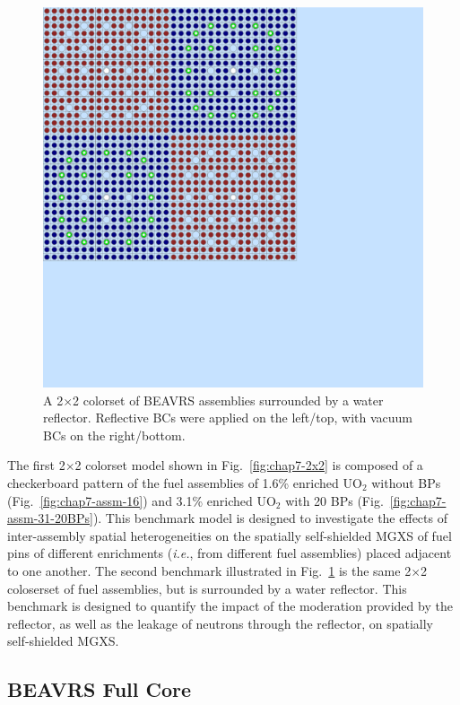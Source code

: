\begin{figure}[h!]
  \centering
  \includegraphics[width=0.63\linewidth]{figures/benchmarks/reflector}
\vspace{2mm}
\caption[A reflected 2$\times$2 colorset of BEAVRS assemblies]{A 2$\times$2 colorset of BEAVRS assemblies surrounded by a water reflector. Reflective \acp{BC} were applied on the left/top, with vacuum \acp{BC} on the right/bottom.}
\label{fig:chap7-reflector}
\end{figure}

The first 2$\times$2 colorset model shown in Fig.~\ref{fig:chap7-2x2} is composed of a checkerboard pattern of the fuel assemblies of 1.6\% enriched UO$_2$ without \acp{BP} (Fig.~\ref{fig:chap7-assm-16}) and 3.1\% enriched UO$_2$ with 20 \acp{BP} (Fig.~\ref{fig:chap7-assm-31-20BPs}). This benchmark model is designed to investigate the effects of inter-assembly spatial heterogeneities on the spatially self-shielded \ac{MGXS} of fuel pins of different enrichments (\textit{i.e.}, from different fuel assemblies) placed adjacent to one another. The second benchmark illustrated in Fig.~\ref{fig:chap7-reflector} is the same 2$\times$2 coloserset of fuel assemblies, but is surrounded by a water reflector. This benchmark is designed to quantify the impact of the moderation provided by the reflector, as well as the leakage of neutrons through the reflector, on spatially self-shielded \ac{MGXS}.


\subsection{BEAVRS Full Core}
\label{subsec:chap7-full-core}

